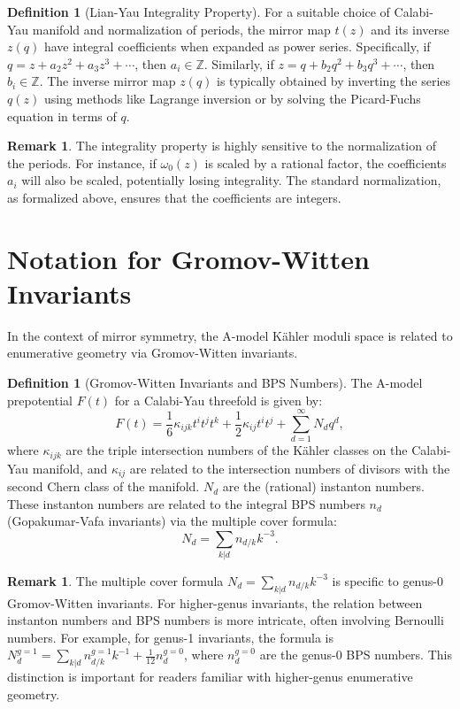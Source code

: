 \documentclass{book}
\newcommand{\omegaf}{\omega_0} %
\newcommand{\qexp}{q} %
\newcommand{\zmod}{z} %
\newcommand{\tmap}{t} %
\newcommand{\Fgen}{F} %
\newcommand{\Nd}{N_d} %
\newcommand{\nd}{n_d} %
\theoremstyle{definition}
\newtheorem{definition}[theorem]{Definition}
\newtheorem{remark}[theorem]{Remark}
\begin{document}
\begin{definition}[Lian-Yau Integrality Property]
For a suitable choice of Calabi-Yau manifold and normalization of periods, the mirror map $\tmap(\zmod)$ and its inverse $\zmod(\qexp)$ have integral coefficients when expanded as power series. Specifically, if $\qexp = \zmod + a_2 \zmod^2 + a_3 \zmod^3 + \cdots$, then $a_i \in \mathbb{Z}$. Similarly, if $\zmod = \qexp + b_2 \qexp^2 + b_3 \qexp^3 + \cdots$, then $b_i \in \mathbb{Z}$. The inverse mirror map $\zmod(\qexp)$ is typically obtained by inverting the series $\qexp(\zmod)$ using methods like Lagrange inversion or by solving the Picard-Fuchs equation in terms of $\qexp$.
\end{definition}

\begin{remark}
The integrality property is highly sensitive to the normalization of the periods. For instance, if $\omegaf(\zmod)$ is scaled by a rational factor, the coefficients $a_i$ will also be scaled, potentially losing integrality. The standard normalization, as formalized above, ensures that the coefficients are integers.
\end{remark}

\section{Notation for Gromov-Witten Invariants}
In the context of mirror symmetry, the A-model K\"ahler moduli space is related to enumerative geometry via Gromov-Witten invariants.

\begin{definition}[Gromov-Witten Invariants and BPS Numbers]
The A-model prepotential $\Fgen(\tmap)$ for a Calabi-Yau threefold is given by:
\[
\Fgen(\tmap) = \frac{1}{6} \kappa_{ijk} \tmap^i \tmap^j \tmap^k + \frac{1}{2} \kappa_{ij} \tmap^i \tmap^j + \sum_{d=1}^\infty \Nd \qexp^d,
\]
where $\kappa_{ijk}$ are the triple intersection numbers of the K\"ahler classes on the Calabi-Yau manifold, and $\kappa_{ij}$ are related to the intersection numbers of divisors with the second Chern class of the manifold. $\Nd$ are the (rational) instanton numbers. These instanton numbers are related to the integral BPS numbers $\nd$ (Gopakumar-Vafa invariants) via the multiple cover formula:
\[
\Nd = \sum_{k|d} n_{d/k} k^{-3}.
\]
\end{definition}

\begin{remark}The multiple cover formula $\Nd = \sum_{k|d} n_{d/k} k^{-3}$ is specific to genus-0 Gromov-Witten invariants. For higher-genus invariants, the relation between instanton numbers and BPS numbers is more intricate, often involving Bernoulli numbers. For example, for genus-1 invariants, the formula is $\Nd^{g=1} = \sum_{k|d} n_{d/k}^{g=1} k^{-1} + \frac{1}{12} n_d^{g=0}$, where $n_d^{g=0}$ are the genus-0 BPS numbers. This distinction is important for readers familiar with higher-genus enumerative geometry.
\end{remark}
\end{document}
